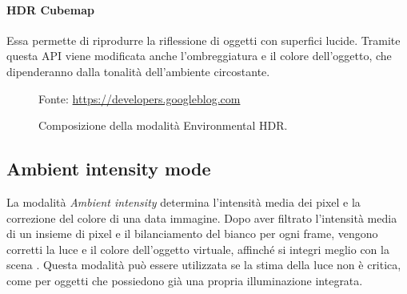 \documentclass[crop=false, class=book]{standalone}
\begin{document}
	
		\paragraph*{HDR Cubemap}
			Essa permette di riprodurre la riflessione di oggetti con superfici lucide. Tramite questa API viene modificata anche l'ombreggiatura e il colore dell'oggetto, che dipenderanno dalla tonalità dell'ambiente circostante.
	
		\begin{figure}
			\centering
			{Fonte: \url{https://developers.googleblog.com}}
			\caption{Composizione della modalità Environmental HDR.}
			\label{fig:env_HDR}
		\end{figure}
	
	\subsection{Ambient intensity mode}
		La modalità \textit{Ambient intensity} determina l'intensità media dei pixel e la correzione del colore di una data immagine. Dopo aver filtrato l'intensità media di un insieme di pixel e il bilanciamento del bianco per ogni frame, vengono corretti la luce e il colore dell'oggetto virtuale, affinché si integri meglio con la scena \cite{suonsivu2020rgbd}. Questa modalità può essere utilizzata se la stima della luce non è critica, come per oggetti che possiedono già una propria illuminazione integrata.
	
	
\end{document}
